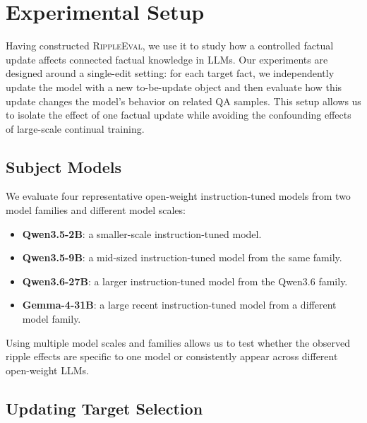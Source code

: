 \section{Experimental Setup}
\label{sec:setup}


Having constructed \textsc{RippleEval}, we use it to study how a controlled factual update affects connected factual knowledge in LLMs. Our experiments are designed around a single-edit setting: for each target fact, we independently update the model with a new to-be-update object and then evaluate how this update changes the model's behavior on related QA samples. This setup allows us to isolate the effect of one factual update while avoiding the confounding effects of large-scale continual training.




\subsection{Subject Models}

We evaluate four representative open-weight instruction-tuned models from two model families and different model scales:
\begin{itemize}
    \setlength\itemsep{0em}
    \item \textbf{Qwen3.5-2B}: a smaller-scale instruction-tuned model.
\item \textbf{Qwen3.5-9B}: a mid-sized instruction-tuned model from the same family.
\item \textbf{Qwen3.6-27B}: a larger instruction-tuned model from the Qwen3.6 family.
\item \textbf{Gemma-4-31B}: a large recent instruction-tuned model from a different model family.
\end{itemize}

Using multiple model scales and families allows us to test whether the observed ripple effects are specific to one model or consistently appear across different open-weight LLMs.

\subsection{Updating Target Selection}

